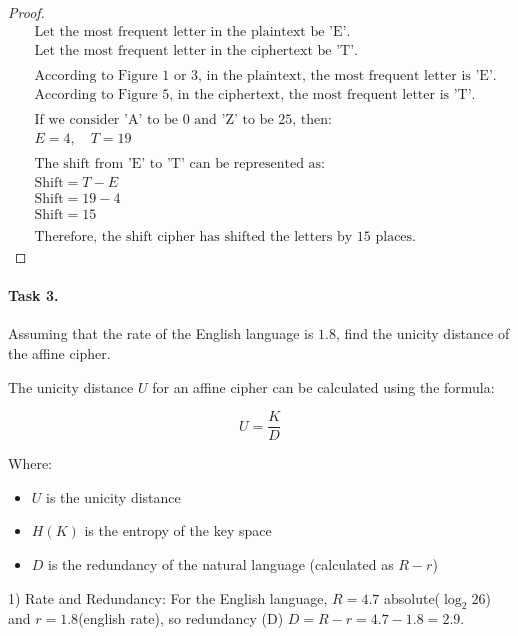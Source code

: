 \documentclass{article}
\begin{document}
\begin{enumerate}
\begin{minipage}{\linewidth}
\begin{proof}
\begin{align*}
              &\text{Let the most frequent letter in the plaintext be 'E'.} \\
              &\text{Let the most frequent letter in the ciphertext be 'T'.} \\
              & \\
              &\text{According to Figure 1 or 3, in the plaintext, the most frequent letter is 'E'.} \\
              &\text{According to Figure 5, in the ciphertext, the most frequent letter is 'T'.} \\
              & \\
              &\text{If we consider 'A' to be 0 and 'Z' to be 25, then:} \\
              &E = 4, \quad T = 19 \\
              & \\
              &\text{The shift from 'E' to 'T' can be represented as:} \\
              &\text{Shift} = T - E \\
              &\text{Shift} = 19 - 4 \\
              &\text{Shift} = 15 \\
              & \\
              &\text{Therefore, the shift cipher has shifted the letters by 15 places.}
            \end{align*}
          \end{proof}
    \end{minipage}
\end{enumerate}


\paragraph{Task 3.} Assuming that the rate of the English language is \(1.8\), find the unicity distance of the affine cipher.

The unicity distance \( U \) for an affine cipher can be calculated using the formula:

\[
  U = \frac{K}{D}
\]

Where:
\begin{itemize}
  \item \( U \) is the unicity distance
  \item \( H(K) \) is the entropy of the key space
  \item \( D \) is the redundancy of the natural language (calculated as \( R - r \))
\end{itemize}
1) Rate and Redundancy:
For the English language, \( R = 4.7 \) absolute($\log_2 26$) and \( r = 1.8 \)(english rate), so redundancy (D) \( D = R - r = 4.7 - 1
.8 = 2.9 \).
\end{document}
